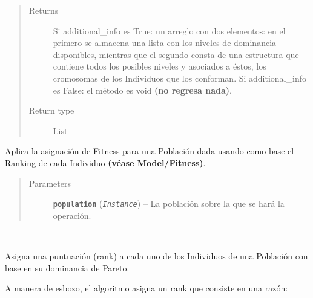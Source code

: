 \documentclass[letterpaper,10pt,english]{sphinxmanual}
\begin{document}
\begin{fulllineitems}
\begin{fulllineitems}
\begin{quote}
\begin{description}
\begin{itemize}
\end{itemize}

\item[{Returns}] \leavevmode
Si additional\_info es True: un arreglo con dos elementos: en el primero 
se almacena una lista con los niveles de dominancia disponibles, mientras que el 
segundo consta de una estructura que contiene todos los posibles niveles y asociados 
a éstos, los cromosomas de los Individuos que los conforman.
Si additional\_info es False: el método es void \textbf{(no regresa nada)}.

\item[{Return type}] \leavevmode
List

\end{description}\end{quote}

\end{fulllineitems}


\begin{fulllineitems}
\label{Model/Community/Community:Model.Community.Community.Community.assign_population_fitness}
Aplica la asignación de Fitness para una Población dada usando como
base el Ranking de cada Individuo \textbf{(véase Model/Fitness)}.
\begin{quote}\begin{description}
\item[{Parameters}] \leavevmode
\textbf{\texttt{population}} (\emph{\texttt{Instance}}) -- La población sobre la que se hará la operación.

\end{description}\end{quote}

\end{fulllineitems}


\begin{fulllineitems}
\label{Model/Community/Community:Model.Community.Community.Community.assign_zitzler_and_thiele_pareto_rank}~
\begin{DUlineblock}{0em}
\item[] Asigna una puntuación (rank) a cada uno de los Individuos de una Población con 
base en su dominancia de Pareto.
\item[] A manera de esbozo, el algoritmo asigna un rank que consiste en una razón:
\end{DUlineblock}


\end{fulllineitems}
\end{fulllineitems}
\end{document}
